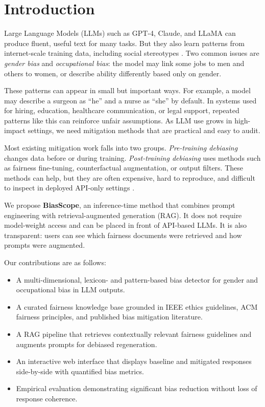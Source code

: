 \documentclass[conference]{IEEEtran}
\begin{document}
\section{Introduction}

Large Language Models (LLMs) such as GPT-4, Claude, and LLaMA can produce fluent, useful text for many tasks. But they also learn patterns from internet-scale training data, including social stereotypes \cite{bender2021}. Two common issues are \emph{gender bias} and \emph{occupational bias}: the model may link some jobs to men and others to women, or describe ability differently based only on gender.

These patterns can appear in small but important ways. For example, a model may describe a surgeon as ``he'' and a nurse as ``she'' by default. In systems used for hiring, education, healthcare communication, or legal support, repeated patterns like this can reinforce unfair assumptions. As LLM use grows in high-impact settings, we need mitigation methods that are practical and easy to audit.

Most existing mitigation work falls into two groups. \emph{Pre-training debiasing} changes data before or during training. \emph{Post-training debiasing} uses methods such as fairness fine-tuning, counterfactual augmentation, or output filters. These methods can help, but they are often expensive, hard to reproduce, and difficult to inspect in deployed API-only settings \cite{gallegos2024survey}.

We propose \textbf{BiasScope}, an inference-time method that combines prompt engineering with retrieval-augmented generation (RAG). It does not require model-weight access and can be placed in front of API-based LLMs. It is also transparent: users can see which fairness documents were retrieved and how prompts were augmented.

Our contributions are as follows:
\begin{itemize}
  \item A multi-dimensional, lexicon- and pattern-based bias detector for gender and occupational bias in LLM outputs.
  \item A curated fairness knowledge base grounded in IEEE ethics guidelines, ACM fairness principles, and published bias mitigation literature.
  \item A RAG pipeline that retrieves contextually relevant fairness guidelines and augments prompts for debiased regeneration.
  \item An interactive web interface that displays baseline and mitigated responses side-by-side with quantified bias metrics.
  \item Empirical evaluation demonstrating significant bias reduction without loss of response coherence.
\end{itemize}
\end{document}
